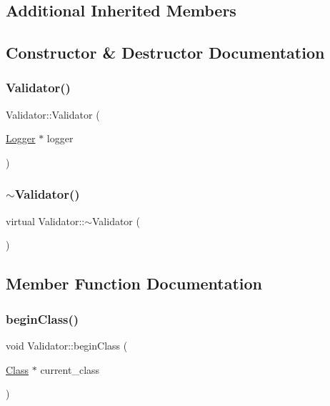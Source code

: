 \subsection*{Additional Inherited Members}


\subsection{Constructor \& Destructor Documentation}
\mbox{\label{classValidator_a7c66bc9f7104715da531915186691eb8}} 
\subsubsection{\texorpdfstring{Validator()}{Validator()}}
{\footnotesize\ttfamily Validator\+::\+Validator (\begin{DoxyParamCaption}\item[{\hyperlink{classLogger}{Logger} $\ast$}]{logger }\end{DoxyParamCaption})}

\mbox{\label{classValidator_a4270e7ebf0c451ff80b4ec6fd8eb6a42}} 
\subsubsection{\texorpdfstring{$\sim$\+Validator()}{~Validator()}}
{\footnotesize\ttfamily virtual Validator\+::$\sim$\+Validator (\begin{DoxyParamCaption}{ }\end{DoxyParamCaption})\hspace{0.3cm}{\ttfamily [virtual]}}



\subsection{Member Function Documentation}
\mbox{\label{classValidator_a364835c9dc181485838d083b6f227fdb}} 
\subsubsection{\texorpdfstring{begin\+Class()}{beginClass()}}
{\footnotesize\ttfamily void Validator\+::begin\+Class (\begin{DoxyParamCaption}\item[{\hyperlink{classClass}{Class} $\ast$}]{current\+\_\+class }\end{DoxyParamCaption})}

